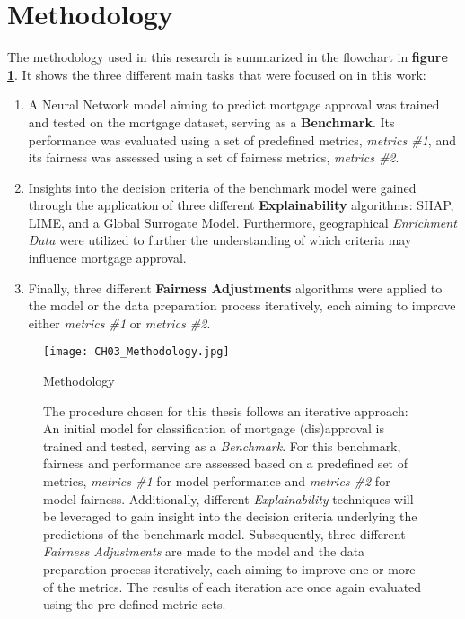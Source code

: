 \section{Methodology}\label{sec:Methodology}

The methodology used in this research is summarized in the flowchart in \textbf{figure \ref{fig:CH03_Methodology}}. It shows the three different main tasks that were focused on in this work:

\begin{enumerate}
    \item A Neural Network model aiming to predict mortgage approval was trained and tested on the mortgage dataset, serving as a \textbf{Benchmark}. Its performance was evaluated using a set of predefined metrics, \textit{metrics \#1}, and its fairness was assessed using a set of fairness metrics, \textit{metrics \#2}.
    \item Insights into the decision criteria of the benchmark model were gained through the application of three different \textbf{Explainability} algorithms: SHAP, LIME, and a Global Surrogate Model. Furthermore, geographical \textit{Enrichment Data} were utilized to further the understanding of which criteria may influence mortgage approval.
    \item Finally, three different \textbf{Fairness Adjustments} algorithms were applied to the model or the data preparation process iteratively, each aiming to improve either \textit{metrics \#1} or \textit{metrics \#2}. 
\end{enumerate}

\begin{figure}[h]
    \centering
    \texttt{[image: CH03\_Methodology.jpg]}
    \caption{Methodology}
    \caption*{The procedure chosen for this thesis follows an iterative approach: An initial model for classification of mortgage (dis)approval is trained and tested, serving as a \textit{Benchmark}. 
    For this benchmark, fairness and performance are assessed based on a predefined set of metrics, \textit{metrics \#1} for model performance and \textit{metrics \#2} for model fairness. 
    Additionally, different \textit{Explainability} techniques will be leveraged to gain insight into the decision criteria underlying the predictions of the benchmark model. 
    Subsequently, three different \textit{Fairness Adjustments} are made to the model and the data preparation process iteratively, each aiming to improve one or more of the metrics. 
    The results of each iteration are once again evaluated using the pre-defined metric sets.}
    \label{fig:CH03_Methodology}
\end{figure}



